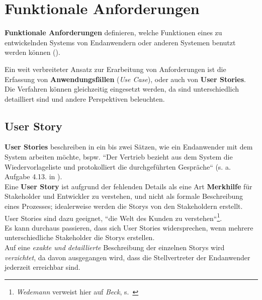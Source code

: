\section{Funktionale Anforderungen}

\vspace{5mm}
\begin{tcolorbox}
    \textbf{Funktionale Anforderungen} definieren, welche Funktionen eines zu entwickelnden Systems von Endanwendern oder anderen Systemen benutzt werden können (\cite[66]{Wed09}).
\end{tcolorbox}
\vspace{5mm}

\noindent
Ein weit verbreiteter Ansatz zur Erarbeitung von Anforderungen ist die Erfassung von \textbf{Anwendungsfällen} (\textit{Use Case}), oder auch von \textbf{User Stories}.\\

\noindent
Die Verfahren können gleichzeitig eingesetzt werden, da sind unterschiedlich detailliert sind und andere Perspektiven beleuchten.

\subsection*{User Story}

\textbf{User Stories} beschreiben in ein bis zwei Sätzen, wie ein Endanwender mit dem System arbeiten möchte, bspw. ``Der Vertrieb bezieht aus dem System die Wiedervorlageliste und protokolliert die durchgeführten Gespräche`` (s. a. Aufgabe 4.13. in \cite{Wed09}).\\

\noindent
Eine \textbf{User Story} ist aufgrund der fehlenden Details als eine Art \textbf{Merkhilfe} für Stakeholder und Entwickler zu verstehen, und nicht als formale Beschreibung eines Prozesses; idealerweise werden die Storys von den Stakeholdern erstellt.\\

\noindent
User Stories sind dazu geeignet, ``die Welt des Kunden zu verstehen``\footnote{
\textit{Wedemann} verweist hier auf \textit{Beck}, s.~\cite[66]{Wed09}
}.\\

\noindent
Es kann durchaus passieren, dass sich User Stories widersprechen, wenn mehrere unterschiedliche Stakeholder die Storys erstellen.\\

\noindent
Auf eine \textit{exakte und detaillierte} Beschreibung der einzelnen Storys wird \textit{verzichtet}, da davon ausgegangen wird, dass die Stellvertreter der Endanwender jederzeit erreichbar sind.\\

